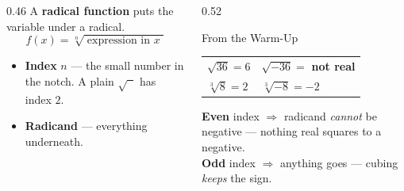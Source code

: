 \documentclass[aspectratio=169, 11pt]{beamer}
\begin{document}
\begin{frame}[t, plain]
  \begin{columns}[T]
    \begin{column}{0.46\textwidth}
      A \textbf{radical function} puts the variable under a radical.
      \[ f(x)=\sqrt[n]{\;\text{expression in } x\;} \]
      \begin{itemize}\setlength{\itemsep}{4pt}
        \item \textbf{Index} $n$ --- the small number in the notch. A plain $\sqrt{\phantom{x}}$ has
              index $2$.
        \item \textbf{Radicand} --- everything underneath.
      \end{itemize}
    \end{column}
    \begin{column}{0.52\textwidth}
      \begin{block}{From the Warm-Up}
        \centering
        \begin{tabular}{ll}
        $\sqrt{36}=6$ & $\sqrt{-36}=$ \textbf{not real} \\[3pt]
        $\sqrt[3]{8}=2$ & $\sqrt[3]{-8}=-2$ \\
        \end{tabular}
      \end{block}
      \vspace{3pt}
      {\footnotesize \textbf{Even} index $\Rightarrow$ radicand \emph{cannot} be negative --- nothing
      real squares to a negative.\\[3pt]
      \textbf{Odd} index $\Rightarrow$ anything goes --- cubing \emph{keeps} the sign.}
    \end{column}
  \end{columns}
\end{frame}
\end{document}
